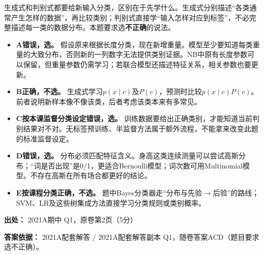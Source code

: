 生成式和判别式都要给新输入分类，区别在于先学什么。生成式分别描述“各类通常产生怎样的数据”，再比较类别；判别式直接学“输入怎样对应到标签”，不必完整描述每一类的数据分布。本题要求选\textbf{不正确}的说法。



\begin{itemize}

\item \textbf{A错误，选。} 假设原来根据长度分类，现在新增重量。模型至少要知道每类重量的大致分布，否则新的一列数字无法提供类别证据。NB中原有长度参数可以保留，但重量参数仍需学习；若联合模型还描述特征关系，相关参数也要更新。

\item \textbf{B正确，不选。} 生成式学习\(p(x\mid c)\)及\(P(c)\)，预测时比较\(p(x\mid c)P(c)\)。前者说明新样本像不像该类，后者考虑该类本来有多常见。

\item \textbf{C按本课监督分类设定错误，选。} 训练数据要给出正确类别，才能知道当前判别结果对不对。无标签预训练、半监督方法属于额外流程，不能拿来改变此题的标准监督设定。

\item \textbf{D错误，选。} 分布必须匹配特征含义。身高这类连续测量可以尝试高斯分布；“词是否出现”是0/1，更适合Bernoulli模型；词次数可用Multinomial模型。不存在高斯在所有场合都更好的结论。

\item \textbf{E按课程分类正确，不选。} 题中Bayes分类器走“分布与先验\ensuremath{\to}后验”的路线；SVM、LR及这些树集成方法直接学习分类规则或类别概率。

\end{itemize}


\textbf{出处：} 2021A期中 Q1，原卷第2页（5分）


\textbf{答案依据：} 2021A配套解答 / 2021A配套解答副本 Q1，随卷答案ACD（题目要求选不正确）。
